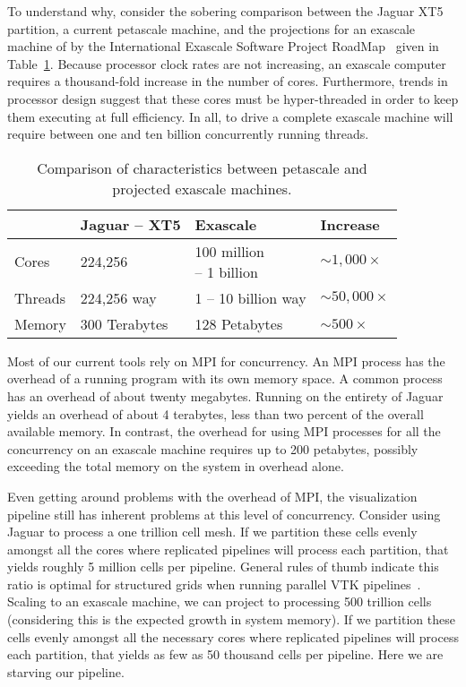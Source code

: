 \documentclass{vgtc}                          %
\newcommand*{\lcite}[1]{~\cite{#1}}
\begin{document}
To understand why, consider the sobering comparison between the
Jaguar XT5 partition, a current petascale machine, and the projections for
an exascale machine of by the International Exascale Software Project
RoadMap\lcite{ExascaleRoadMap} given in Table~\ref{table:PetaExaCompare}.
Because processor clock rates are not increasing, an exascale computer
requires a thousand-fold increase in the number of cores.  Furthermore,
trends in processor design suggest that these cores must be hyper-threaded
in order to keep them executing at full efficiency.  In all, to drive a
complete exascale machine will require between one and ten billion
concurrently running threads.

\begin{table}[htbp]
  \centering
  \caption{Comparison of characteristics between petascale and projected
    exascale machines.}
  \label{table:PetaExaCompare}
  \begin{tabular}{llll}
    & Jaguar -- XT5 & Exascale & Increase \\
    \hline
    Cores & 224,256 & \parbox{.7in}{\vspace*{2pt}100 million\\ \hspace*{6pt} -- 1 billion\vspace*{2pt}} & $\sim{}1,000\times$ \\
    Threads & 224,256 way & 1 -- 10 billion way & $\sim{}50,000\times$ \\
    Memory & 300 Terabytes & 128 Petabytes & $\sim{}500\times$
  \end{tabular}
\end{table}

Most of our current tools rely on MPI for concurrency.  An MPI process has
the overhead of a running program with its own memory space.  A common
process has an overhead of about twenty megabytes.  Running on the entirety
of Jaguar yields an overhead of about 4 terabytes, less than two percent of
the overall available memory.  In contrast, the overhead for using MPI
processes for all the concurrency on an exascale machine requires up to 200
petabytes, possibly exceeding the total memory on the system in overhead
alone.

Even getting around problems with the overhead of MPI, the visualization
pipeline still has inherent problems at this level of concurrency.
Consider using Jaguar to process a one trillion cell mesh.  If we partition
these cells evenly amongst all the cores where replicated pipelines will
process each partition, that yields roughly 5 million cells per pipeline.
General rules of thumb indicate this ratio is optimal for structured grids
when running parallel VTK pipelines\lcite{ParaViewTutorial}.  Scaling to an
exascale machine, we can project to processing 500 trillion cells
(considering this is the expected growth in system memory).  If we
partition these cells evenly amongst all the necessary cores where
replicated pipelines will process each partition, that yields as few as 50
thousand cells per pipeline.  Here we are starving our pipeline.
\end{document}
